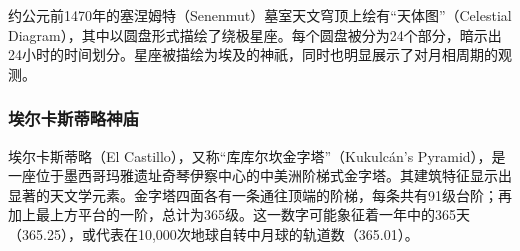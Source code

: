 约公元前1470年的塞涅姆特（Senenmut）墓室天文穹顶上绘有“天体图”（Celestial Diagram），其中以圆盘形式描绘了绕极星座。每个圆盘被分为24个部分，暗示出24小时的时间划分。星座被描绘为埃及的神祇，同时也明显展示了对月相周期的观测。
\subsubsection{埃尔卡斯蒂略神庙}
埃尔卡斯蒂略（El Castillo），又称“库库尔坎金字塔”（Kukulcán's Pyramid），是一座位于墨西哥玛雅遗址奇琴伊察中心的中美洲阶梯式金字塔。其建筑特征显示出显著的天文学元素。金字塔四面各有一条通往顶端的阶梯，每条共有91级台阶；再加上最上方平台的一阶，总计为365级。这一数字可能象征着一年中的365天（365.25），或代表在10,000次地球自转中月球的轨道数（365.01）。
